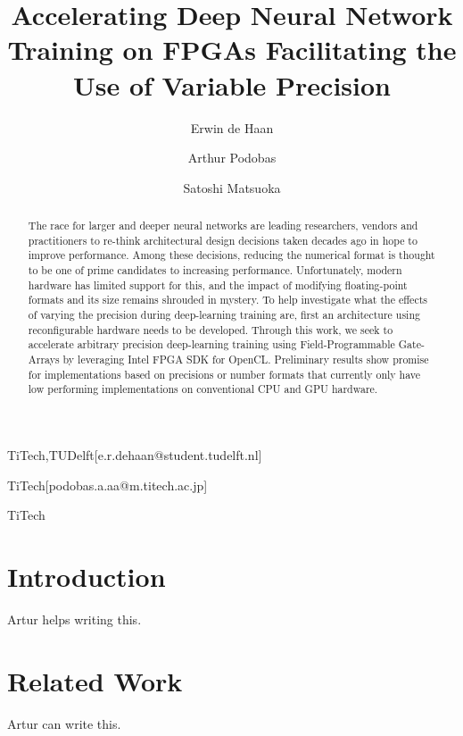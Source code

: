 \documentclass[techrep,english]{ipsj}
\begin{document}
\title{Accelerating Deep Neural Network Training on FPGAs Facilitating the Use of Variable Precision}


\author{Erwin de Haan}{TiTech,TUDelft}[e.r.dehaan@student.tudelft.nl]
\author{Arthur Podobas}{TiTech}[podobas.a.aa@m.titech.ac.jp]
\author{Satoshi Matsuoka}{TiTech}

\begin{abstract}
The race for larger and deeper neural networks are leading researchers, vendors and practitioners to re-think architectural design decisions taken decades ago in hope to improve performance.
Among these decisions, reducing the numerical format is thought to be one of prime candidates to increasing performance.
Unfortunately, modern hardware has limited support for this, and the impact of modifying floating-point formats and its size remains shrouded in mystery.
To help investigate what the effects of varying the precision during deep-learning training are, first an architecture using reconfigurable hardware needs to be developed.
Through this work, we seek to accelerate arbitrary precision deep-learning training using Field-Programmable Gate-Arrays by leveraging Intel FPGA SDK for OpenCL.
Preliminary results show promise for implementations based on precisions or number formats that currently only have low performing implementations on conventional CPU and GPU hardware.
\end{abstract}


\maketitle

\section{Introduction}
Artur helps writing this.

\section{Related Work}
Artur can write this.
\end{document}
